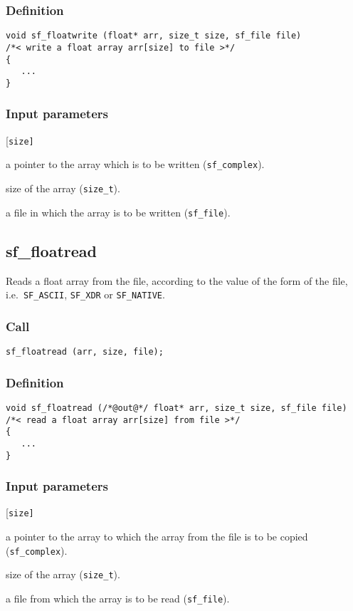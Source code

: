 \subsubsection*{Definition}
\begin{verbatim}
void sf_floatwrite (float* arr, size_t size, sf_file file)
/*< write a float array arr[size] to file >*/
{
   ...
}
\end{verbatim}

\subsubsection*{Input parameters}
\begin{desclist}{\tt }{\quad}[\tt size]
   \setlength\itemsep{0pt}
   \item[arr]  a pointer to the array which is to be written (\texttt{sf\_complex}). 
   \item[size] size of the array (\texttt{size\_t}). 
   \item[file] a file in which the array is to be written (\texttt{sf\_file}).
\end{desclist}




\subsection{{sf\_floatread}}\label{sec:sf_floatread}
Reads a float array from the file, according to the value of the form of the file, i.e.~\texttt{SF\_ASCII}, \texttt{SF\_XDR} or \texttt{SF\_NATIVE}.

\subsubsection*{Call}
\begin{verbatim}sf_floatread (arr, size, file);\end{verbatim}

\subsubsection*{Definition}
\begin{verbatim}
void sf_floatread (/*@out@*/ float* arr, size_t size, sf_file file)
/*< read a float array arr[size] from file >*/
{
   ...
}
\end{verbatim}

\subsubsection*{Input parameters}
\begin{desclist}{\tt }{\quad}[\tt size]
   \setlength\itemsep{0pt}
   \item[arr]  a pointer to the array to which the array from the file is to be copied (\texttt{sf\_complex}). 
   \item[size] size of the array (\texttt{size\_t}). 
   \item[file] a file from which the array is to be read (\texttt{sf\_file}).
\end{desclist}




